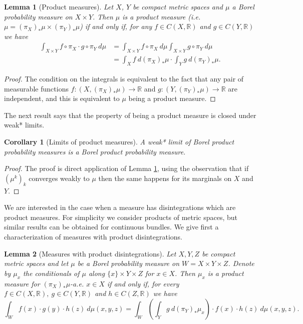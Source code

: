 \documentclass[11pt,letterpaper,reqno]{article}
\newtheorem{lemma}{Lemma}[section]
\newtheorem{corollary}{Corollary}[section]
\newcommand{\Real}{\mathbb R}
\begin{document}
\begin{lemma}[Product measures]\label{le:productmeasures}
Let $X$, $Y$ be compact metric spaces and $\mu$ a Borel probability measure on $X\times Y$. Then $\mu$ is a product measure (i.e. $\mu=(\pi_{X})_*\mu \times 
(\pi_{Y})_* \mu$) if and only if, for any $f\in C(X,\mathbb R)$ and $g\in C(Y,\mathbb R)$ we have
\begin{align}\label{eq:product}
\nonumber\int_{X\times Y}f\circ\pi_X \cdot g\circ \pi_Y \ d\mu &=
\int_{X\times Y} f \circ \pi_X \ d\mu\int_{X\times Y } g \circ \pi_Y \ d\mu\\
& = \int_X f\ d(\pi_{X})_* \mu \cdot \int_Y g \ d(\pi_{Y})_* \mu.
\end{align}
\end{lemma}



\begin{proof}
The condition on the integrals is equivalent to the fact that any pair of measurable functions $f:(X,(\pi_{X})_*\mu) \to \Real$ and $g:(Y,(\pi_{Y})_* \mu) \to \Real$ are independent, and this is equivalent to $\mu$ being a product measure.


\end{proof}

The next result says that the property of being a product measure is closed under weak* limits.

\begin{corollary}[Limits of product measures]
A weak* limit of Borel product probability measures is a Borel product probability measure.
\end{corollary}

\begin{proof}
The proof is direct application of Lemma \ref{le:productmeasures}, using the observation that if $(\mu^k)_k$ converges weakly to $\mu$ then the same happens for its marginals on $X$ and $Y$.
\end{proof}

We are interested in the case when a measure has disintegrations which are product measures. For simplicity we consider products of metric spaces, but similar results can be obtained for continuous bundles. We give first a characterization of measures with product disintegrations.

\begin{lemma}[Measures with product disintegrations]\label{le:productmeasuresd}
Let $X,Y,Z$ be compact metric spaces and let $\mu$ be a Borel probability measure on $W = X \times Y \times Z$. Denote by $\mu_x$ the conditionals of $\mu$ along $\{x\} \times Y \times Z$ for $x\in X$. Then $\mu_x$ is a product measure for $(\pi_{X})_*\mu$-a.e. $x\in X$ if and only if, for every $f\in C(X,\mathbb R),\ g\in C(Y,\mathbb R)$ and $h\in C(Z,\mathbb R)$ we have
\begin{equation}\label{eq:integralproduct}
\int_W f(x)\cdot g(y)\cdot h(z)\ d\mu(x,y,z)=\int_W \left(\int_Y g \ d(\pi_{Y})_* \mu_x\right)\cdot f(x) \cdot h(z)\ d\mu(x,y,z).
\end{equation}

\end{lemma}
\end{document}
